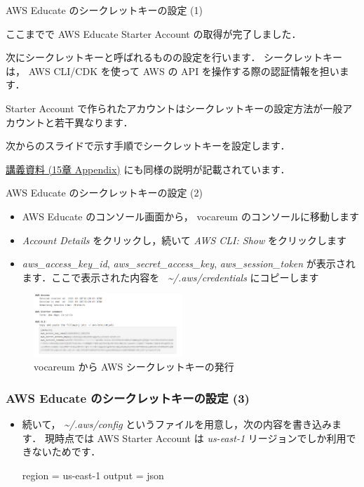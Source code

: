\documentclass[unicode,11pt]{beamer}
\begin{document}
\begin{frame}{AWS Educate のシークレットキーの設定 (1)}

ここまでで AWS Educate Starter Account の取得が完了しました．

次にシークレットキーと呼ばれるものの設定を行います．
シークレットキーは， AWS CLI/CDK を使って AWS の API を操作する際の認証情報を担います．

Starter Account で作られたアカウントはシークレットキーの設定方法が一般アカウントと若干異なります．

次からのスライドで示す手順でシークレットキーを設定します．

\href{https://tomomano.github.io/learn-aws-by-coding/}{講義資料 (15章 Appendix)} にも同様の説明が記載されています．
    
\end{frame}

\begin{frame}{AWS Educate のシークレットキーの設定 (2)}

\begin{itemize}
    \item AWS Educate のコンソール画面から， vocareum のコンソールに移動します
    \item \emph{Account Details} をクリックし，続いて \emph{AWS CLI: Show} をクリックします
    \item \emph{aws\_access\_key\_id}, \emph{aws\_secret\_access\_key}, \emph{aws\_session\_token} が表示されます．ここで表示された内容を \emph{~\textasciitilde/.aws/credentials} にコピーします
\end{itemize}

\begin{figure}
    \centering
    \includegraphics[width=0.5\textwidth]{imgs/vocareum_secret.png}
    \caption{vocareum から AWS シークレットキーの発行}
\end{figure}

\end{frame}

\begin{frame}[fragile]
\frametitle{AWS Educate のシークレットキーの設定 (3)}

\begin{itemize}
    \item 続いて， \emph{\textasciitilde/.aws/config} というファイルを用意し，次の内容を書き込みます．
    現時点では AWS Starter Account は \emph{us-east-1} リージョンでしか利用できないためです．
    
    \begin{semiverbatim}
    region = us-east-1
    output = json
    \end{semiverbatim}
\end{itemize}

\end{frame}
\end{document}
